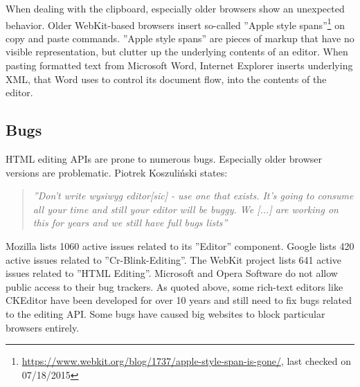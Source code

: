 When dealing with the clipboard, especially older browsers show an unexpected behavior. Older WebKit-based browsers insert so-called ''Apple style spans''\footnote{\url{https://www.webkit.org/blog/1737/apple-style-span-is-gone/}, last checked on 07/18/2015} on copy and paste commands. ''Apple style spans'' are pieces of markup that have no visible representation, but clutter up the underlying contents of an editor. When pasting formatted text from Microsoft Word, Internet Explorer inserts underlying XML, that Word uses to control its document flow, into the contents of the editor.


\subsection{Bugs} 

HTML editing APIs are prone to numerous bugs. Especially older browser versions are problematic. Piotrek Koszuli\'{n}ski states:


\begin{quotation}
\textit{''Don't write wysiwyg editor[sic] - use one that exists. It's going to consume all your time and still your editor will be buggy. We [...] are working on this for years and we still have full bugs lists\cite{sopp}''}
\end{quotation} %


\noindent Mozilla lists 1060 active issues related to its ''Editor'' component\cite{bi}. Google lists 420 active issues related to ''Cr-Blink-Editing''\cite{bh}. The WebKit project lists 641 active issues related to ''HTML Editing''\cite{bg}. Microsoft and Opera Software do not allow public access to their bug trackers. As quoted above, some rich-text editors like CKEditor have been developed for over 10 years and still need to fix bugs related to the editing API\cite{bf}\cite{so_paste_plain}. Some bugs have caused big websites to block particular browsers entirely\cite{medium_blocked}. %

